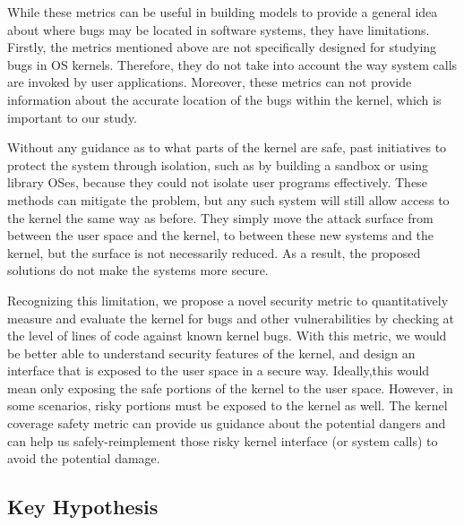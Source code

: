 While these metrics can be useful in building models to provide a general
idea about
where bugs may be located in software systems, they have limitations.
Firstly, the metrics mentioned above are not specifically designed for
studying bugs in OS kernels.
Therefore, they do not take into account the way system calls are invoked
by user applications.
Moreover, these metrics can not provide information about the accurate
location of the bugs within the kernel,
which is important to our study.

Without any guidance as to what parts of the kernel are safe, past
initiatives to protect the system through isolation,
such as by building a sandbox or using library OSes, because they could not
isolate user programs effectively.  
These methods can mitigate the problem, but any such system will still
allow access to the kernel the same way as before.
They simply move the attack surface from between the user space and the
kernel, 
to between these new systems and the kernel, but the surface is not
necessarily reduced.
As a result, the proposed solutions do not make the systems more secure.

Recognizing this limitation, we propose a novel security metric to
quantitatively measure and evaluate the kernel for bugs and other
vulnerabilities by checking at the level of lines of code against
known kernel bugs.
With this metric, we would be better able to understand security features
of the kernel, and design an interface that is exposed to the user space
in a secure way.
Ideally,this would mean only exposing the safe portions of the kernel to
the user space.
However, in some scenarios, risky portions must be exposed to the kernel as
well.
The kernel coverage safety metric %
 can provide us guidance about the potential dangers and
can help us safely-reimplement those risky kernel interface (or system
calls) to avoid the potential damage.



\subsection{Key Hypothesis}


